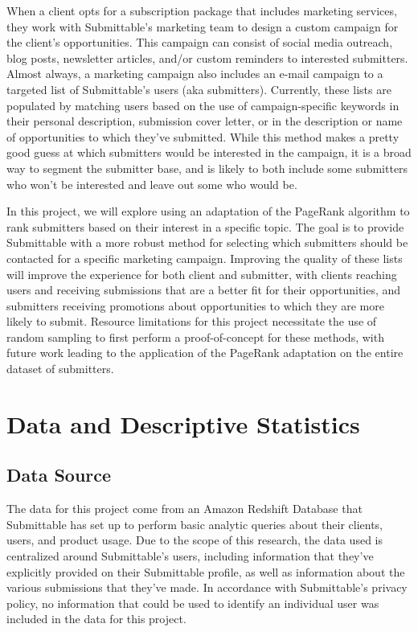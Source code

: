 \documentclass[]{report}   %
\begin{document}
When a client opts for a subscription package that includes marketing services, they work with Submittable's marketing team to design a custom campaign for the client's opportunities. This campaign can consist of social media outreach, blog posts, newsletter articles, and/or custom reminders to interested submitters. Almost always, a marketing campaign also includes an e-mail campaign to a targeted list of Submittable's users (aka submitters). Currently, these lists are populated by matching users based on the use of campaign-specific keywords in their personal description, submission cover letter, or in the description or name of opportunities to which they've submitted. While this method makes a pretty good guess at which submitters would be interested in the campaign, it is a broad way to segment the submitter base, and is likely to both include some submitters who won't be interested and leave out some who would be. 

In this project, we will explore using an adaptation of the PageRank algorithm to rank submitters based on their interest in a specific topic. The goal is to provide Submittable with a more robust method for selecting which submitters should be contacted for a specific marketing campaign. Improving the quality of these lists will improve the experience for both client and submitter, with clients reaching users and receiving submissions that are a better fit for their opportunities, and submitters receiving promotions about opportunities to which they are more likely to submit. Resource limitations for this project necessitate the use of random sampling to first perform a proof-of-concept for these methods, with future work leading to the application of the PageRank adaptation on the entire dataset of submitters.

\chapter{Data and Descriptive Statistics}         
\section{Data Source}
The data for this project come from an Amazon Redshift Database that Submittable has set up to perform basic analytic queries about their clients, users, and product usage. Due to the scope of this research, the data used is centralized around Submittable's users, including information that they've explicitly provided on their Submittable profile, as well as information about the various submissions that they've made. In accordance with Submittable's privacy policy, no information that could be used to identify an individual user was included in the data for this project.
\end{document}
